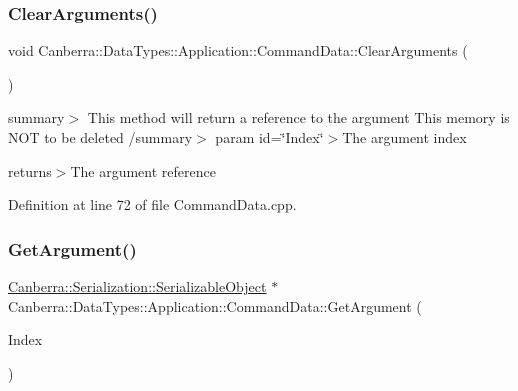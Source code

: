 \mbox{\label{class_canberra_1_1_data_types_1_1_application_1_1_command_data_ae493f2d17249b2d2d33136cf60aad38c_ae493f2d17249b2d2d33136cf60aad38c}} 
\subsubsection{\texorpdfstring{Clear\+Arguments()}{ClearArguments()}}
{\footnotesize\ttfamily void Canberra\+::\+Data\+Types\+::\+Application\+::\+Command\+Data\+::\+Clear\+Arguments (\begin{DoxyParamCaption}\item[{void}]{ }\end{DoxyParamCaption})}

summary$>$ This method will return a reference to the argument This memory is N\+OT to be deleted /summary$>$ param id=\char`\"{}\+Index\char`\"{}$>$The argument index

returns$>$The argument reference

Definition at line 72 of file Command\+Data.\+cpp.

\mbox{\label{class_canberra_1_1_data_types_1_1_application_1_1_command_data_a09b4c39d51d4f1e2ba1be53239787242_a09b4c39d51d4f1e2ba1be53239787242}} 
\subsubsection{\texorpdfstring{Get\+Argument()}{GetArgument()}}
{\footnotesize\ttfamily \hyperlink{class_canberra_1_1_serialization_1_1_serializable_object}{Canberra\+::\+Serialization\+::\+Serializable\+Object} $\ast$ Canberra\+::\+Data\+Types\+::\+Application\+::\+Command\+Data\+::\+Get\+Argument (\begin{DoxyParamCaption}\item[{const U\+S\+H\+O\+RT}]{Index }\end{DoxyParamCaption})}

